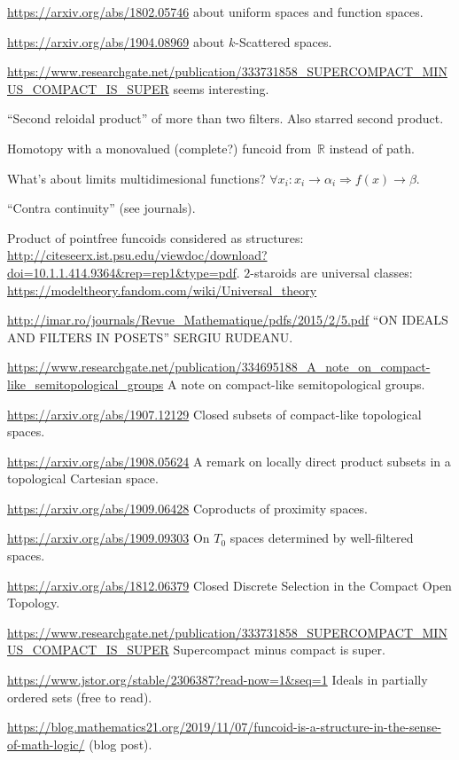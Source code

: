 \documentclass{amsart}
\begin{document}
\url{https://arxiv.org/abs/1802.05746} about uniform spaces and
function spaces.

\url{https://arxiv.org/abs/1904.08969} about $k$-Scattered spaces.

\url{https://www.researchgate.net/publication/333731858_SUPERCOMPACT_MINUS_COMPACT_IS_SUPER}
seems interesting.

``Second reloidal product'' of more than two filters.
Also starred second product.

Homotopy with a monovalued (complete?) funcoid from~$\mathbb{R}$
instead of path.

What's about limits multidimesional functions? $\forall x_i : x_i \rightarrow
\alpha_i \Rightarrow f (x) \rightarrow \beta$.

``Contra continuity'' (see journals).

Product of pointfree funcoids considered as structures:
\url{http://citeseerx.ist.psu.edu/viewdoc/download?doi=10.1.1.414.9364&rep=rep1&type=pdf}.
$2$-staroids are universal classes: \url{https://modeltheory.fandom.com/wiki/Universal_theory}

\url{http://imar.ro/journals/Revue_Mathematique/pdfs/2015/2/5.pdf}
``ON IDEALS AND FILTERS IN POSETS'' SERGIU RUDEANU.

\url{https://www.researchgate.net/publication/334695188_A_note_on_compact-like_semitopological_groups}
A note on compact-like semitopological groups.

\url{https://arxiv.org/abs/1907.12129} Closed subsets of compact-like topological spaces.

\url{https://arxiv.org/abs/1908.05624} A remark on locally direct product subsets in a topological Cartesian space.

\url{https://arxiv.org/abs/1909.06428} Coproducts of proximity spaces.

\url{https://arxiv.org/abs/1909.09303} On $T_0$ spaces determined by well-filtered spaces.

\url{https://arxiv.org/abs/1812.06379} Closed Discrete Selection in the Compact Open Topology.

\url{https://www.researchgate.net/publication/333731858_SUPERCOMPACT_MINUS_COMPACT_IS_SUPER}
Supercompact minus compact is super.

\url{https://www.jstor.org/stable/2306387?read-now=1&seq=1} Ideals in partially ordered sets (free to read).

\url{https://blog.mathematics21.org/2019/11/07/funcoid-is-a-structure-in-the-sense-of-math-logic/} (blog post).
\end{document}
